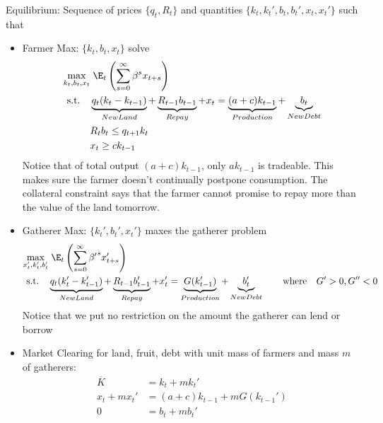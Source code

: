 \documentclass[12pt]{article}
\theoremstyle{plain}
\theoremstyle{definition}
\theoremstyle{remark}
\begin{document}
\clearpage
Equilibrium:
Sequence of prices $\{q_t,R_t\}$ and quantities
$\{k_t,k_t',b_t,b_t',x_t,x_t'\}$
such that
\begin{itemize}
  \item Farmer Max: $\{k_t,b_t,x_t\}$ solve
    \begin{align*}
      \max_{k_t,b_t,x_t} &\;
      \E_t\left(
      \sum_{s=0}^\infty
      \beta^sx_{t+s}
      \right)
      \\
      \text{s.t.}\quad
      &
      \underbrace{q_t(k_t-k_{t-1})}_{New Land}
      + \underbrace{R_{t-1}b_{t-1}}_{Repay}
      + x_t
      =
      \underbrace{(a+c)k_{t-1}}_{Production}
      + \underbrace{b_t}_{New Debt}
      \\
      &
      R_{t}b_t \leq q_{t+1}k_t
      \\
      &x_t\geq ck_{t-1}
    \end{align*}
    Notice that of total output $(a+c)k_{t-1}$, only $ak_{t-1}$ is
    tradeable. This makes sure the farmer doesn't continually postpone
    consumption.
    The collateral constraint says that the farmer cannot promise to
    repay more than the value of the land tomorrow.
  \item Gatherer Max: $\{k_t',b_t',x_t'\}$ maxes the gatherer problem
    \begin{align*}
      \max_{x_t',k_t',b_t'} &\;
      \E_t\left(
      \sum_{s=0}^\infty
      {\beta'}^sx_{t+s}'
      \right)
      \\
      \text{s.t.}\quad
      &
      \underbrace{q_t(k_t'-k_{t-1}')}_{New Land}
      + \underbrace{R_{t-1}b_{t-1}'}_{Repay}
      + x_t'
      =
      \underbrace{G(k_{t-1}')}_{Production}
      + \underbrace{b_t'}_{New Debt}
      \qquad\text{where}\quad
      G'>0, G''<0
    \end{align*}
    Notice that we put no restriction on the amount the gatherer can
    lend or borrow
  \item Market Clearing for land, fruit, debt with unit mass of
    farmers and mass $m$ of gatherers:
    \begin{align*}
      \overline{K} &= k_t + mk_t' \\
      x_t+mx_t' &= (a+c)k_{t-1} + mG(k_{t-1}') \\
      0 &= b_t + mb_t'
    \end{align*}
\end{itemize}
\end{document}
